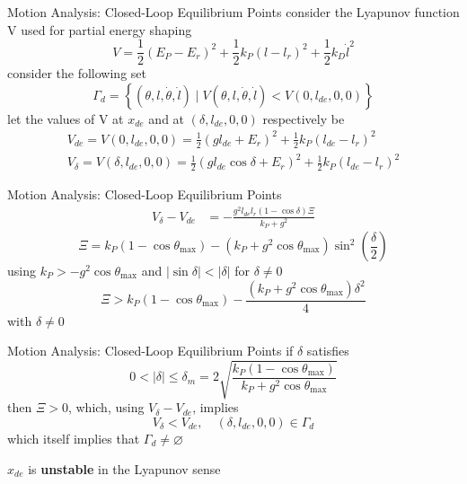\documentclass[10pt]{beamer}
\begin{document}
  \begin{frame}{Motion Analysis: Closed-Loop Equilibrium Points}
    consider the Lyapunov function V used for partial energy shaping
    \begin{equation*}
      V = \frac{1}{2}(E_P-E_r)^2+\frac{1}{2}k_P(l-l_r)^2+
        \frac{1}{2}k_D\dot{l}^2
    \end{equation*}
    consider the following set
    \begin{equation*}
      \Gamma_d = \left\{ (\theta, l, \dot{\theta}, \dot{l})
        \mid V(\theta, l, \dot{\theta}, \dot{l}) <
        V(0, l_{de}, 0, 0) \right\}
    \end{equation*}
    let the values of V at $x_{de}$
    and at $(\delta, l_{de}, 0, 0)$ respectively be
    \begin{gather*}
      V_{de} = V(0, l_{de}, 0, 0) = \frac{1}{2}(g l_{de} + E_r)^2
        + \frac{1}{2} k_P (l_{de} - l_r)^2 \\
      V_\delta = V(\delta, l_{de}, 0, 0) = \frac{1}{2}(g l_{de}
        \cos\delta + E_r)^2 + \frac{1}{2} k_P (l_{de} - l_r)^2
    \end{gather*}
  \end{frame}

  \begin{frame}{Motion Analysis: Closed-Loop Equilibrium Points}
    \begin{align*}
      V_\delta - V_{de} %
        &= -\frac{g^2 l_{de} l_r (1-\cos\delta) \Xi}{k_P+g^2}
    \end{align*}
    \begin{equation*}
        \Xi = k_P(1-\cos\theta_{\max})-(k_P+g^2\cos\theta_{\max})
            \sin^2 \left( \frac{\delta}{2} \right)
    \end{equation*}
    using $k_P > -g^2\cos\theta_{\max}$ and
    $|\sin \delta|<|\delta|$ for $\delta \neq 0$
    \begin{equation*}
      \Xi > k_P(1-\cos\theta_{\max})-
        \frac{(k_P+g^2\cos\theta_{\max})\delta^2}{4}
    \end{equation*}
    with $\delta \neq 0$
  \end{frame}

  \begin{frame}{Motion Analysis: Closed-Loop Equilibrium Points}
    if $\delta$ satisfies
    \begin{equation*}
      0 < |\delta| \le \delta_m = 2
        \sqrt{\frac{k_P(1-\cos\theta_{\max})}{k_P+g^2\cos\theta_{\max}}}
    \end{equation*}
    then $\Xi>0$,
    which, using $V_\delta - V_{de}$, implies
    \begin{equation*}
      V_\delta < V_{de}, \quad (\delta, l_{de}, 0, 0) \in \Gamma_d
    \end{equation*}
    which itself implies%
    that $\Gamma_d \neq \varnothing$

    $x_{de}$ is \textbf{unstable} in the Lyapunov sense
  \end{frame}
\end{document}
